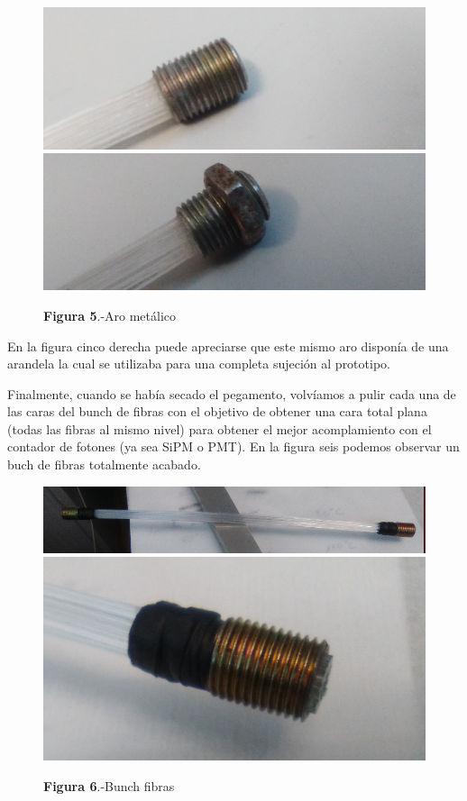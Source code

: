 \begin{figure}[htb]
\centering
{
\includegraphics[scale=0.3]{arometalico.png} 
}
{
\includegraphics[scale=0.3]{arometalicoconrosca.png} 
}
\caption{\textbf{Figura 5}.-Aro metálico}
\end{figure} 

En la figura cinco derecha puede apreciarse que este mismo aro disponía de una arandela la cual se utilizaba para una completa sujeción al prototipo.

Finalmente, cuando se había secado el pegamento, volvíamos a pulir cada una de las caras del bunch de fibras con el objetivo de obtener una cara total plana (todas las fibras al mismo nivel) para obtener el mejor acomplamiento con el contador de fotones (ya sea SiPM o PMT). En la figura seis podemos observar un buch de fibras totalmente acabado.

\begin{figure}[htb]
\centering
{
\includegraphics[scale=0.3]{bunchfibras.png} 
}
{
\includegraphics[scale=0.3]{bunchfibras1.png} 
}
\caption{\textbf{Figura 6}.-Bunch fibras}
\end{figure} 

